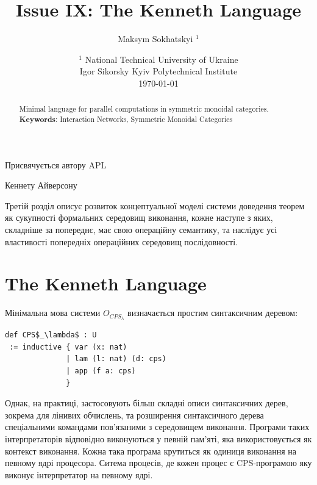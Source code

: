 \documentclass{article}
\begin{document}
\title{Issue IX: The Kenneth Language}
\author{Maksym Sokhatskyi $^1$}
\date{ $^1$ National Technical University of Ukraine \\
       \small Igor Sikorsky Kyiv Polytechnical Institute \\
       \today }

\maketitle

\begin{abstract}

Minimal language for parallel computations in symmetric monoidal categories. \\
{\bf Keywords}: Interaction Networks, Symmetric Monoidal Categories
\end{abstract}


\ifincludeTOC
  \tableofcontents
\fi

\newpage

\epigraph{Присвячується автору APL}{Кеннету Айверсону}

Третій розділ описує розвиток концептуальної моделі системи доведення теорем як сукупності
формальних середовищ виконання, кожне наступе з яких, складніше за попереднє,
має свою операційну семантику, та наслідує усі властивості попередніх операційних середовищ послідовності.

\section{The Kenneth Language}

Мінімальна мова системи $O_{CPS_\lambda}$ визначається простим
синтаксичним деревом:

\begin{lstlisting}
def CPS$_\lambda$ : U
 := inductive { var (x: nat)
              | lam (l: nat) (d: cps)
              | app (f a: cps)
              }
\end{lstlisting}

Однак, на практиці, застосовують більш складні описи синтаксичних дерев,
зокрема для лінивих обчислень, та розширення синтаксичного дерева спеціальними
командами пов'язаними з середовищем виконання. Програми таких
інтерпретаторів відповідно виконуються у певній пам'яті, яка
використовується як контекст виконання. Кожна така програма крутиться
як одиниця виконання на певному ядрі процесора. Ситема процесів, де
кожен процес є CPS-програмою яку виконує інтерпретатор на певному ядрі.
\end{document}
